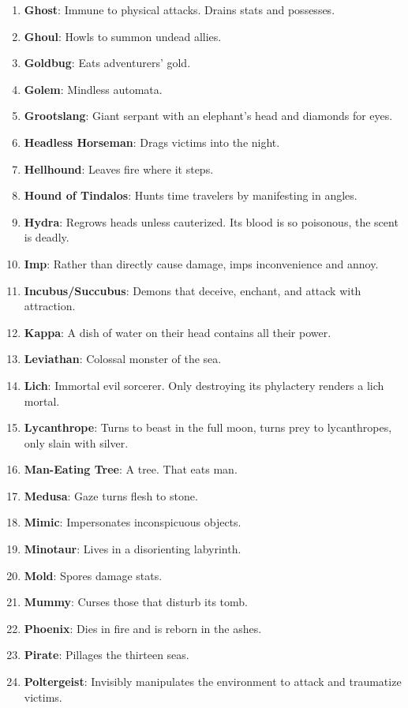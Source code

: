 \documentclass[twoside]{article}
\begin{document}
\begin{enumerate}[nosep]
\item \textbf{Ghost}: Immune to physical attacks. Drains stats and possesses.
\item \textbf{Ghoul}: Howls to summon undead allies.
\item \textbf{Goldbug}: Eats adventurers' gold.
\item \textbf{Golem}: Mindless automata.
\item \textbf{Grootslang}: Giant serpant with an elephant's head and diamonds for eyes.
\item \textbf{Headless Horseman}: Drags victims into the night.
\item \textbf{Hellhound}: Leaves fire where it steps.
\item \textbf{Hound of Tindalos}: Hunts time travelers by manifesting in angles.
\item \textbf{Hydra}: Regrows heads unless cauterized. Its blood is so poisonous, the scent is deadly.
\item \textbf{Imp}: Rather than directly cause damage, imps inconvenience and annoy.
\item \textbf{Incubus/Succubus}: Demons that deceive, enchant, and attack with attraction.
\item \textbf{Kappa}: A dish of water on their head contains all their power.
\item \textbf{Leviathan}: Colossal monster of the sea.
\item \textbf{Lich}: Immortal evil sorcerer. Only destroying its phylactery renders a lich mortal.
\item \textbf{Lycanthrope}: Turns to beast in the full moon, turns prey to lycanthropes, only slain with silver. 
\item \textbf{Man-Eating Tree}: A tree. That eats man.
\item \textbf{Medusa}: Gaze turns flesh to stone.
\item \textbf{Mimic}: Impersonates inconspicuous objects.
\item \textbf{Minotaur}: Lives in a disorienting labyrinth.
\item \textbf{Mold}: Spores damage stats.
\item \textbf{Mummy}: Curses those that disturb its tomb.
\item \textbf{Phoenix}: Dies in fire and is reborn in the ashes.
\item \textbf{Pirate}: Pillages the thirteen seas.
\item \textbf{Poltergeist}: Invisibly manipulates the environment to attack and traumatize victims.

\end{enumerate}
\end{document}
